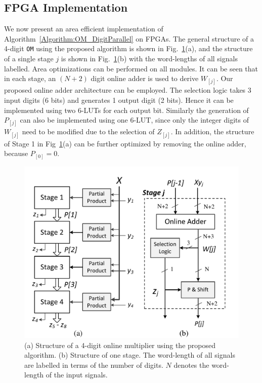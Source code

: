 \documentclass[conference]{IEEEtran}
\begin{document}
\subsection{FPGA Implementation}
We now present an area efficient implementation of Algorithm~\ref{Algorithm:OM_DigitParallel} on FPGAs. The general structure of a 4-digit \texttt{OM} using the proposed algorithm is shown in Fig.~\ref{Fig:PMStructure}(a), and the structure of a single stage $j$ is shown in Fig.~\ref{Fig:PMStructure}(b) with the word-lengths of all signals labelled. Area optimizations can be performed on all modules. It can be seen that in each stage, an $(N+2)$ digit online adder is used to derive $W_{[j]}$. Our proposed online adder architecture can be employed. The selection logic takes 3 input digits (6 bits) and generates 1 output digit (2 bits). Hence it can be implemented using two 6-LUTs for each output bit. Similarly the generation of $P_{[j]}$ can also be implemented using one 6-LUT, since only the integer digits of $W_{[j]}$ need to be modified due to the selection of $Z_{[j]}$. In addition, the structure of Stage 1 in Fig~\ref{Fig:PMStructure}(a) can be further optimized by removing the online adder, because $P_{[0]}=0$.
%
\begin{figure}[tbp]
	\centering
	\includegraphics[width=.5\textwidth]{./Figures/ParallelMult_Structure.pdf}
	\vspace{-3ex}
	\caption{(a) Structure of a 4-digit online multiplier using the proposed algorithm. (b) Structure of one stage. The word-length of all signals are labelled in terms of the number of digits. $N$ denotes the word-length of the input signals.}
	\label{Fig:PMStructure}
	\vspace{-1ex}
\end{figure}
\end{document}
